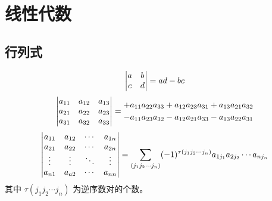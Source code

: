 \documentclass{ctexbook}
\begin{document}
\part{线性代数}

\chapter{行列式}

\begin{definition}[行列式]
    \begin{equation}
        \mqty|a & b \\ c & d|=ad-bc
    \end{equation}
    \begin{equation}
        \mqty|\xmat*{a}{3}{3}|=\begin{aligned}
            +a_{11}a_{22}a_{33}+a_{12}a_{23}a_{31}+a_{13}a_{21}a_{32}\\
            -a_{11}a_{23}a_{32}-a_{12}a_{21}a_{33}-a_{13}a_{22}a_{31}
        \end{aligned}
    \end{equation}
    \begin{equation}
        \mqty|a_{11} & a_{12} & \cdots & a_{1n}\\
        a_{21} & a_{22} & \cdots & a_{2n}\\
        \vdots & \vdots & \ddots & \vdots\\
        a_{n1} & a_{a2} & \cdots & a_{nn}|=\sum_{(j_1j_2\cdots j_n)}(-1)^{\tau(j_1j_2\cdots j_n)}a_{1j_1}a_{2j_2}\cdots a_{nj_n}
    \end{equation}
    其中 $\tau(j_1j_2\cdots j_n)$ 为逆序数对的个数。
\end{definition}
\end{document}

